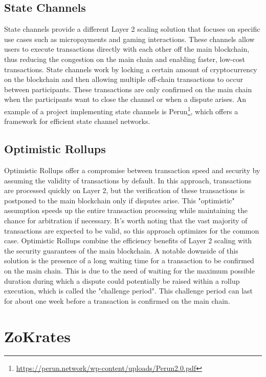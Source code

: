 \subsection{State Channels}
State channels provide a different Layer 2 scaling solution that focuses on specific use cases such as micropayments and gaming interactions. These channels allow users to execute transactions directly with each other off the main blockchain, thus reducing the congestion on the main chain and enabling faster, low-cost transactions\cite{negka_blockchain_2021}. State channels work by locking a certain amount of cryptocurrency on the blockchain and then allowing multiple off-chain transactions to occur between participants. These transactions are only confirmed on the main chain when the participants want to close the channel or when a dispute arises. An example of a project implementing state channels is Perun\footnote{\url{https://perun.network/wp-content/uploads/Perun2.0.pdf}}, which offers a framework for efficient state channel networks.

\subsection{Optimistic Rollups \label{subsec:optimisticRollups}}
Optimistic Rollups offer a compromise between transaction speed and security by assuming the validity of transactions by default\cite{thibault_blockchain_2022}. In this approach, transactions are processed quickly on Layer 2, but the verification of these transactions is postponed to the main blockchain only if disputes arise. This "optimistic" assumption speeds up the entire transaction processing while maintaining the chance for arbitration if necessary. It's worth noting that the vast majority of transactions are expected to be valid, so this approach optimizes for the common case. Optimistic Rollups combine the efficiency benefits of Layer 2 scaling with the security guarantees of the main blockchain. A notable downside of this solution is the presence of a long waiting time for a transaction to be confirmed on the main chain. This is due to the need of waiting for the maximum possible duration during which a dispute could potentially be raised within a rollup execution, which is called the "challenge period"\cite{negka_blockchain_2021}. This challenge period can last for about one week before a transaction is confirmed on the main chain.

\section{ZoKrates}


